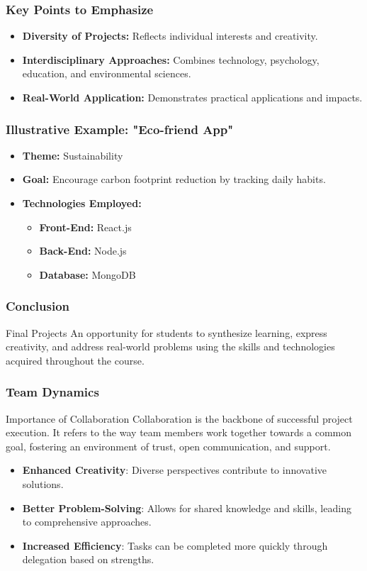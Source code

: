 \documentclass[aspectratio=169]{beamer}
\begin{document}
\begin{frame}[fragile]
    \frametitle{Key Points to Emphasize}
    \begin{itemize}
        \item \textbf{Diversity of Projects:} Reflects individual interests and creativity.
        \item \textbf{Interdisciplinary Approaches:} Combines technology, psychology, education, and environmental sciences.
        \item \textbf{Real-World Application:} Demonstrates practical applications and impacts.
    \end{itemize}
\end{frame}

\begin{frame}[fragile]
    \frametitle{Illustrative Example: "Eco-friend App"}
    \begin{itemize}
        \item \textbf{Theme:} Sustainability
        \item \textbf{Goal:} Encourage carbon footprint reduction by tracking daily habits.
        \item \textbf{Technologies Employed:} 
        \begin{itemize}
            \item \textbf{Front-End:} React.js
            \item \textbf{Back-End:} Node.js
            \item \textbf{Database:} MongoDB
        \end{itemize}
    \end{itemize}
\end{frame}

\begin{frame}[fragile]
    \frametitle{Conclusion}
    \begin{block}{Final Projects}
        An opportunity for students to synthesize learning, express creativity, and address real-world problems using the skills and technologies acquired throughout the course.
    \end{block}
\end{frame}

\begin{frame}[fragile]
    \frametitle{Team Dynamics}
    \begin{block}{Importance of Collaboration}
        Collaboration is the backbone of successful project execution. It refers to the way team members work together towards a common goal, fostering an environment of trust, open communication, and support.
    \end{block}
    \begin{itemize}
        \item \textbf{Enhanced Creativity}: Diverse perspectives contribute to innovative solutions.
        \item \textbf{Better Problem-Solving}: Allows for shared knowledge and skills, leading to comprehensive approaches.
        \item \textbf{Increased Efficiency}: Tasks can be completed more quickly through delegation based on strengths.
    \end{itemize}
\end{frame}
\end{document}
